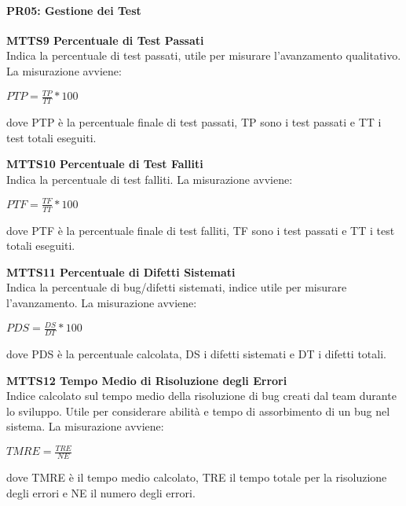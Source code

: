 \paragraph{PR05: Gestione dei Test}
\begin{itemize}

	\item \textbf{MTTS9 Percentuale di Test Passati}\-\\
Indica la percentuale di test passati, utile per misurare l'avanzamento qualitativo. La misurazione avviene:
\begin{center}
	\item $PTP = \frac{TP}{TT}*100$
\end{center}
dove PTP è la percentuale finale di test passati, TP sono i test passati e TT i test totali eseguiti.

	\item \textbf{MTTS10 Percentuale di Test Falliti}\-\\
Indica la percentuale di test falliti. La misurazione avviene:
\begin{center}
	\item $PTF = \frac{TF}{TT}*100$
\end{center}
dove PTF è la percentuale finale di test falliti, TF sono i test passati e TT i test totali eseguiti.

	\item \textbf{MTTS11 Percentuale di Difetti Sistemati}\-\\
Indica la percentuale di bug/difetti sistemati, indice utile per misurare l'avanzamento. La misurazione avviene:
\begin{center}
	\item $PDS = \frac{DS}{DT}*100$
\end{center}
dove PDS è la percentuale calcolata, DS i difetti sistemati e DT i difetti totali.

	\item \textbf{MTTS12 Tempo Medio di Risoluzione degli Errori}\-\\
Indice calcolato sul tempo medio della risoluzione di bug creati dal team durante lo sviluppo. Utile per considerare abilità e tempo di assorbimento di un bug nel sistema. La misurazione avviene:
\begin{center}
	\item $TMRE = \frac{TRE}{NE}$
\end{center}
dove TMRE è il tempo medio calcolato, TRE il tempo totale per la risoluzione degli errori e NE il numero degli errori.


\end{itemize}
